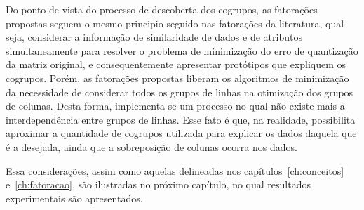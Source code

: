 \documentclass[
    12pt,                %
    oneside,            %
    a4paper,            %
    english,            %
    brazil                %
    ]{abntex2ppgsi}
\begin{document}
Do ponto de vista do processo de descoberta dos cogrupos, as fatorações propostas seguem o mesmo principio seguido nas fatorações da literatura, qual seja, considerar a informação de similaridade de dados e de atributos simultaneamente para resolver o problema de minimização do erro de quantização da matriz original, e consequentemente apresentar protótipos que expliquem os cogrupos.
Porém, as fatorações propostas liberam os algoritmos de minimização da necessidade de considerar todos os grupos de linhas na otimização dos grupos de colunas.
Desta forma, implementa-se um processo no qual não existe mais a interdependência entre grupos de linhas.
Esse fato é que, na realidade, possibilita aproximar a quantidade de cogrupos utilizada para explicar os dados daquela que é a desejada, ainda que a sobreposição de colunas ocorra nos dados.

Essa considerações, assim como aquelas delineadas nos capítulos~\ref{ch:conceitos} e~\ref{ch:fatoracao}, são ilustradas no próximo capítulo, no qual resultados experimentais são apresentados.




\end{document}
